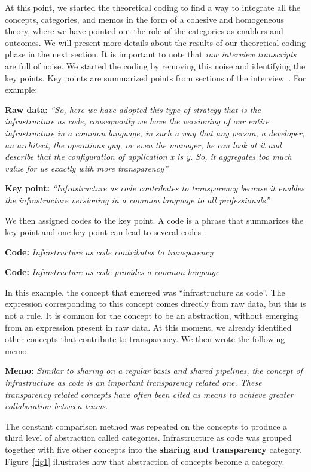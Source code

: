 At this point, we started the theoretical coding to find a way to integrate
all the concepts, categories, and memos in the form of a cohesive and
homogeneous theory, where we have pointed out the role of the categories as
enablers and outcomes. We will present more details about
the results of our theoretical coding phase in the next section.
It is important to note that \emph{raw interview transcripts} are full of noise.
We started the coding by removing this noise and identifying the key points.
Key points are summarized points from sections of the interview~\cite{georgieva2008best}.
For example:

\textbf{Raw data:} \textit{``So, here we have adopted this type of strategy that is
the infrastructure as code, consequently we have the versioning of our entire
infrastructure in a common language, in such a way that any person, a
developer, an architect, the operations guy, or even the manager, he can look
at it and describe that the configuration of application x is y. So, it
aggregates too much value for us exactly with more transparency''}

\textbf{Key point:} \textit{``Infrastructure as code contributes to
transparency because it enables the infrastructure versioning in a common
language to all professionals''}

We then assigned codes to the key point. A code is a phrase that summarizes
the key point and one key point can lead to several codes \cite{hoda2017becoming}.

\textbf{Code:} \textit{Infrastructure as code contributes to transparency}

\textbf{Code:} \textit{Infrastructure as code provides a common language}

In this example, the concept that emerged was ``infrastructure as code''. The
expression corresponding to this concept comes directly from raw data, but this
is not a rule. It is common for the concept to be an abstraction, without
emerging from an expression present in raw data.
At this moment, we already identified other concepts that
contribute to transparency. We then wrote the following memo:

\textbf{Memo:} \textit{Similar to sharing on a regular basis and shared
pipelines, the concept of infrastructure as code is an important transparency
related one. These transparency related concepts have often been cited as
means to achieve greater collaboration between teams}.

The constant comparison method was repeated on the concepts to produce a third
level of abstraction called categories. Infrastructure as code was grouped
together with five other concepts into the \textbf{sharing and transparency} category.
Figure~\ref{fig1} illustrates how that abstraction of concepts become a category.


